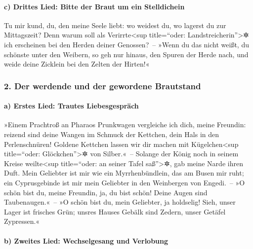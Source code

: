 \hypertarget{c-drittes-lied-bitte-der-braut-um-ein-stelldichein}{%
\paragraph{c) Drittes Lied: Bitte der Braut um ein
Stelldichein}\label{c-drittes-lied-bitte-der-braut-um-ein-stelldichein}}

Tu mir kund, du, den meine Seele liebt: wo weidest du, wo
lagerst du zur Mittagszeit? Denn warum soll als Verirrte\textless sup
title=``oder: Landstreicherin''\textgreater✲ ich erscheinen bei den
Herden deiner Genossen?~-- »Wenn du das nicht weißt, du
schönste unter den Weibern, so geh nur hinaus, den Spuren der Herde
nach, und weide deine Zicklein bei den Zelten der Hirten!«

\hypertarget{der-werdende-und-der-gewordene-brautstand}{%
\subsubsection{2. Der werdende und der gewordene
Brautstand}\label{der-werdende-und-der-gewordene-brautstand}}

\hypertarget{a-erstes-lied-trautes-liebesgespruxe4ch}{%
\paragraph{a) Erstes Lied: Trautes
Liebesgespräch}\label{a-erstes-lied-trautes-liebesgespruxe4ch}}

»Einem Prachtroß an Pharaos Prunkwagen vergleiche ich
dich, meine Freundin: reizend sind deine Wangen im
Schmuck der Kettchen, dein Hals in den Perlenschnüren!
Goldene Kettchen lassen wir dir machen mit
Kügelchen\textless sup title=``oder: Glöckchen''\textgreater✲ von
Silber.«~-- Solange der König noch in seinem Kreise
weilte\textless sup title=``oder: an seiner Tafel saß''\textgreater✲,
gab meine Narde ihren Duft. Mein Geliebter ist mir wie
ein Myrrhenbündlein, das am Busen mir ruht; ein
Cyprusgebinde ist mir mein Geliebter in den Weinbergen von Engedi.~--
»O schön bist du, meine Freundin, ja, du bist schön!
Deine Augen sind Taubenaugen.«~-- »O schön bist du, mein
Geliebter, ja holdselig! Sieh, unser Lager ist frisches Grün;
unsres Hauses Gebälk sind Zedern, unser Getäfel
Zypressen.«

\hypertarget{b-zweites-lied-wechselgesang-und-verlobung}{%
\paragraph{b) Zweites Lied: Wechselgesang und
Verlobung}\label{b-zweites-lied-wechselgesang-und-verlobung}}


